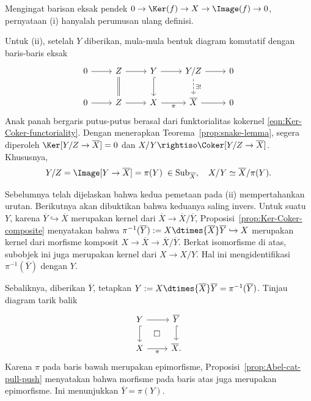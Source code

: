\begin{bukti}
	Mengingat barisan eksak pendek
	$0\to\Ker(f)\to X\to\Image(f)\to0$, pernyataan (i) hanyalah
	perumusan ulang definisi.

	Untuk (ii), setelah $Y$ diberikan, mula-mula bentuk diagram komutatif
	dengan baris-baris eksak
	\[\begin{tikzcd}
		0 \arrow[r] & Z \arrow[r] \arrow[equal, d] & Y \arrow[r] \arrow[hookrightarrow, d] & Y/Z \arrow[dashed, d, "\exists!"] \arrow[r] & 0 \\
		0 \arrow[r] & Z \arrow[r] & X \arrow[r, "\pi"'] & \overline{X} \arrow[r] & 0
	\end{tikzcd}\]
	Anak panah bergaris putus-putus berasal dari funktorialitas kokernel
	\eqref{eqn:Ker-Coker-functoriality}. Dengan menerapkan
	Teorema~\ref{prop:snake-lemma}, segera diperoleh
	$\Ker[Y/Z\to\overline{X}]=0$ dan
	$X/Y\rightiso\Coker[Y/Z\to\overline{X}]$. Khususnya,
	\[ Y/Z =  \Image[Y \to \overline{X}] = \pi(Y) \;\in \mathrm{Sub}_{\overline{X}}, \quad X/Y \simeq \overline{X}/\pi(Y). \]

	Sebelumnya telah dijelaskan bahwa kedua pemetaan pada (ii) mempertahankan
	urutan. Berikutnya akan dibuktikan bahwa keduanya saling invers. Untuk suatu
	$Y$, karena $\overline{Y}\hookrightarrow\overline{X}$ merupakan kernel dari
	$\overline{X}\to\overline{X}/\overline{Y}$,
	Proposisi~\ref{prop:Ker-Coker-composite} menyatakan bahwa
	$\pi^{-1}(\overline{Y}):=X\dtimes{\overline{X}}\overline{Y}\hookrightarrow X$
	merupakan kernel dari morfisme komposit
	$X\to\overline{X}\to\overline{X}/\overline{Y}$. Berkat isomorfisme di
	atas, subobjek ini juga merupakan kernel dari $X\to X/Y$. Hal ini
	mengidentifikasi $\pi^{-1}(\overline{Y})$ dengan $Y$.

	Sebaliknya, diberikan $\overline{Y}$, tetapkan
	$Y:=X\dtimes{\overline{X}}\overline{Y}=\pi^{-1}(\overline{Y})$. Tinjau
	diagram tarik balik
	\[\begin{tikzcd}
		Y \arrow[r] \arrow[hookrightarrow, d] & \overline{Y} \arrow[hookrightarrow, d] \\
		X \arrow[r, "\pi"'] & \overline{X} \arrow[phantom, lu, "\Box" description] .
	\end{tikzcd}\]
	Karena $\pi$ pada baris bawah merupakan epimorfisme,
	Proposisi~\ref{prop:Abel-cat-pull-push} menyatakan bahwa morfisme pada baris
	atas juga merupakan epimorfisme. Ini menunjukkan
	$\overline{Y}=\pi(Y)$.


\end{bukti}

